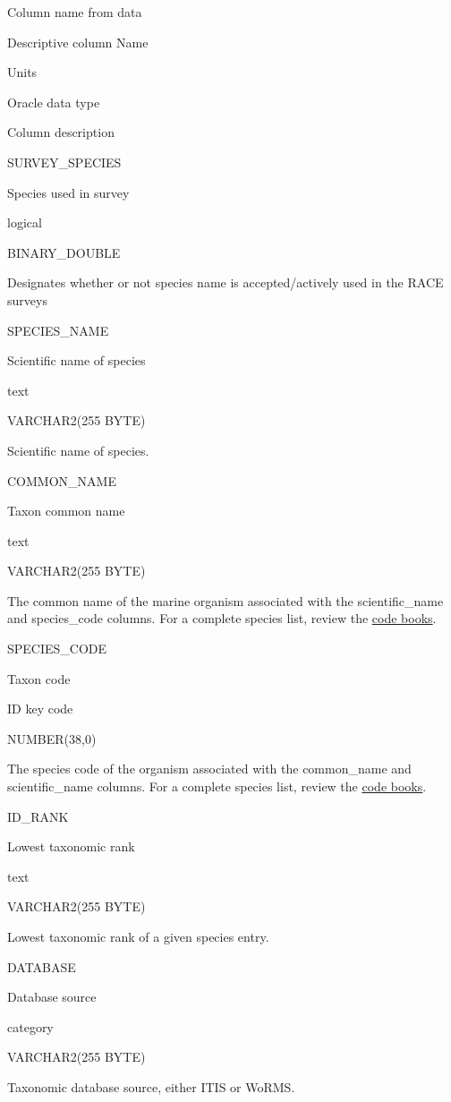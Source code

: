 \documentclass[
  letterpaper,
  oneside,
  open=any]{scrbook}
\begin{document}
Column name from data

Descriptive column Name

Units

Oracle data type

Column description

SURVEY\_SPECIES

Species used in survey

logical

BINARY\_DOUBLE

Designates whether or not species name is accepted/actively used in the
RACE surveys

SPECIES\_NAME

Scientific name of species

text

VARCHAR2(255 BYTE)

Scientific name of species.

COMMON\_NAME

Taxon common name

text

VARCHAR2(255 BYTE)

The common name of the marine organism associated with the
scientific\_name and species\_code columns. For a complete species list,
review the
\href{https://www.fisheries.noaa.gov/resource/document/groundfish-survey-species-code-manual-and-data-codes-manual}{code
books}.

SPECIES\_CODE

Taxon code

ID key code

NUMBER(38,0)

The species code of the organism associated with the common\_name and
scientific\_name columns. For a complete species list, review the
\href{https://www.fisheries.noaa.gov/resource/document/groundfish-survey-species-code-manual-and-data-codes-manual}{code
books}.

ID\_RANK

Lowest taxonomic rank

text

VARCHAR2(255 BYTE)

Lowest taxonomic rank of a given species entry.

DATABASE

Database source

category

VARCHAR2(255 BYTE)

Taxonomic database source, either ITIS or WoRMS.
\end{document}
